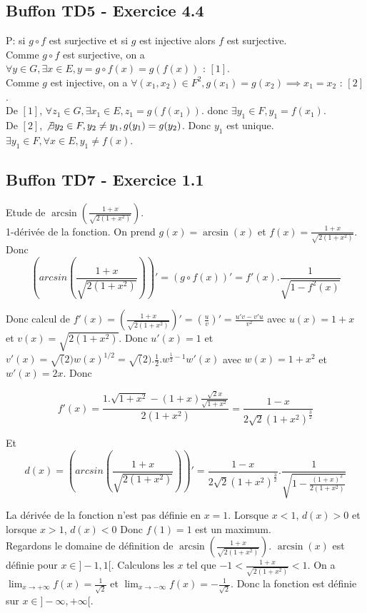 \documentclass[]{book}
\theoremstyle{definition}
\begin{document}
\subsection*{Buffon TD5 - Exercice 4.4}
P:  si $g \circ f$ est surjective et si $g$ est injective alors $f$ est surjective.\\
Comme $g \circ f$ est surjective, on a $\forall y \in G, \exists x \in E, y = g \circ f(x)=g(f(x)) \textrm{  : } [1]$.\\
Comme $g$ est injective, on a $\forall (x_1, x_2) \in F^2, g(x_1) = g(x_2) \implies x_1 = x_2 \textrm{  : }[2]$.\\

De $[1]$, $\forall z_1 \in G, \exists x_1 \in E, z_1 = g(f(x_1))$. donc $\exists y_1 \in F, y_1 = f(x_1)$.\\ 
De $[2]$, $\not \exists y_2 \in F, y_2 \neq y_1, g(y_1) = g(y_2)$. Donc $y_1$ est unique.\\
$\exists y_1 \in F, \forall x \in E, y_1 \neq f(x)$.


\newpage
\subsection*{Buffon TD7 - Exercice 1.1}
Etude de $\arcsin(\frac{1+x}{\sqrt{2(1+x^2)}})$.\\
1-d\'eriv\'ee de la fonction. On prend $g(x) = \arcsin(x)$ et $f(x)=\frac{1+x}{\sqrt{2(1+x^2)}}$. Donc
$$\left(arcsin(\frac{1+x}{\sqrt{2(1+x^2)}})\right)' = (g \circ f(x))' = f'(x).\frac{1}{\sqrt{1-f^2(x)}}$$

Donc calcul de $f'(x) = \left(\frac{1+x}{\sqrt{2(1+x^2)}}\right)' = \left(\frac{u}{v}\right)' = \frac{u'v-v'u}{v^2}$ avec $u(x) = 1+x$ et $v(x)=\sqrt{2(1+x^2)}$. Donc $u'(x) = 1$ et $v'(x) = \sqrt(2)w(x)^{1/2} = \sqrt(2).\frac{1}{2}.w^{\frac{1}{2}-1}w'(x)$ avec $w(x) = 1+x^2$ et $w'(x) = 2x$. Donc

$$f'(x) = \frac{1.\sqrt{1+x^2}-(1+x)\frac{\sqrt{2}x}{\sqrt{1+x^2}}}{2(1+x^2)}  = \frac{1-x}{2\sqrt{2}(1+x^2)^{\frac{3}{2}}}$$

Et
$$d(x) = \left(arcsin(\frac{1+x}{\sqrt{2(1+x^2)}})\right)' = \frac{1-x}{2\sqrt{2}(1+x^2)^{\frac{3}{2}}}.\frac{1}{\sqrt{1-\frac{(1+x)^2}{2(1+x^2)}}}$$

La d\'eriv\'ee de la fonction n'est pas d\'efinie en $x=1$.
Lorsque $x<1$, $d(x) > 0$ et lorsque $x>1$, $d(x) < 0$ Donc $f(1) = 1$ est un maximum.\\

Regardons le domaine de d\'efinition de $\arcsin(\frac{1+x}{\sqrt{2(1+x^2)}})$. $\arcsin(x)$ est d\'efinie pour $x \in ]-1,1[$. Calculons les $x$ tel que $-1 < \frac{1+x}{\sqrt{2(1+x^2)}} < 1$. On a $\lim_{x\to+\infty} f(x) = \frac{1}{\sqrt{2}}$ et $\lim_{x\to-\infty} f(x) = -\frac{1}{\sqrt{2}}$. Donc la fonction est d\'efinie sur $x \in ]-\infty, +\infty[$.\\
\end{document}
